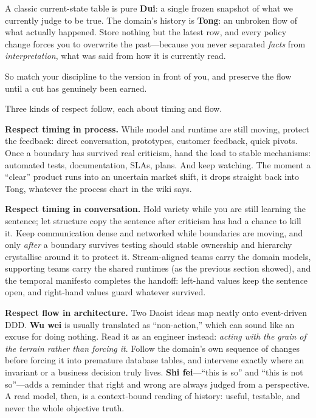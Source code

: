 \documentclass[10pt,a4paper]{article}
\begin{document}
A classic current-state table is pure \textbf{Dui}: a single frozen snapshot of what we currently judge to be true. The domain's history is \textbf{Tong}: an unbroken flow of what actually happened. Store nothing but the latest row, and every policy change forces you to overwrite the past—because you never separated \emph{facts} from \emph{interpretation}, what was said from how it is currently read.

So match your discipline to the version in front of you, and preserve the flow until a cut has genuinely been earned.

Three kinds of respect follow, each about timing and flow.

\textbf{Respect timing in process.} While model and runtime are still moving, protect the feedback: direct conversation, prototypes, customer feedback, quick pivots. Once a boundary has survived real criticism, hand the load to stable mechanisms: automated tests, documentation, SLAs, plans. And keep watching. The moment a “clear” product runs into an uncertain market shift, it drops straight back into Tong, whatever the process chart in the wiki says.

\textbf{Respect timing in conversation.} Hold variety while you are still learning the sentence; let structure copy the sentence after criticism has had a chance to kill it. Keep communication dense and networked while boundaries are moving, and only \emph{after} a boundary survives testing should stable ownership and hierarchy crystallise around it to protect it. Stream-aligned teams carry the domain models, supporting teams carry the shared runtimes (as the previous section showed), and the temporal manifesto completes the handoff: left-hand values keep the sentence open, and right-hand values guard whatever survived.

\textbf{Respect flow in architecture.} Two Daoist ideas map neatly onto event-driven DDD. \textbf{Wu wei} is usually translated as “non-action,” which can sound like an excuse for doing nothing. Read it as an engineer instead: \emph{acting with the grain of the terrain rather than forcing it}. Follow the domain's own sequence of changes before forcing it into premature database tables, and intervene exactly where an invariant or a business decision truly lives. \textbf{Shi fei}—“this is so” and “this is not so”—adds a reminder that right and wrong are always judged from a perspective. A read model, then, is a context-bound reading of history: useful, testable, and never the whole objective truth.
\end{document}
